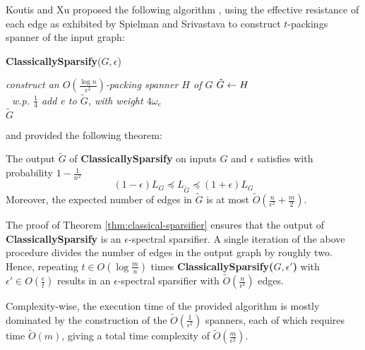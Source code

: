 
Koutis and Xu proposed the following algorithm \cite{koutis_simple_2016}, 
using the effective resistance of each edge as exhibited by Spielman and 
Srivastava to construct $t$-packings spanner of the input graph:
\begin{algorithm}[H]
    \caption{\textbf{ClassicallySparsify}($G,
    \epsilon$)}\label{alg:classical-sparsify}
    \begin{algorithmic}[1]
    \State \textit{construct an $O(\frac{\log n}{\epsilon ^2})$-packing spanner
    $H$ of $G$} 
    \State $\tilde{G} \leftarrow H $  \\
    \textit{$\;$ w.p. $\frac{1}{4}$ add e to $\tilde{G}$, with weight
    $4\omega_e$} \EndFor \\
    \Return $\tilde{G}$
    \end{algorithmic}
\end{algorithm}
and provided the following theorem:
\begin{theorem}\label{thm:classical-sparsifier} The output
    $\tilde{G}$ of \textbf{ClassicallySparsify} on inputs $G$ and $\epsilon$
    satisfies with probability $1 - \frac{1}{n^2}$
    \begin{equation*}
        (1 - \epsilon) L_G \preccurlyeq L_{\tilde{G}} \preccurlyeq (1 + \epsilon) L_G
    \end{equation*}
    Moreover, the expected number of edges in $\tilde{G}$ is at most
    $\tilde{O}(\frac{n}{\epsilon ^2} + \frac{m}{2})$.
\end{theorem}

The proof of Theorem \ref{thm:classical-sparsifier}
\cite{koutis_simple_2016} ensures that the output of
\textbf{ClassicallySparsify} is an $\epsilon$-spectral sparsifier. A single
iteration of the above procedure divides the number of edges in the output graph
by roughly two. Hence, repeating $ t \in O(\log \frac{m}{n})$ times
\textbf{ClassicallySparsify($G, \epsilon'$)} with $\epsilon' \in
O(\frac{\epsilon}{t}) $ results in an $\epsilon$-spectral sparsifier with
$\tilde{O}(\frac{n}{\epsilon ^2})$ edges.

Complexity-wise, the execution time of the provided algorithm is mostly
dominated by the construction of the $\tilde{O}(\frac{1}{\epsilon^2})$ spanners,
each of which requires time $\tilde{O}(m)$, giving a total time complexity of
$\tilde{O}(\frac{m}{\epsilon^2})$.